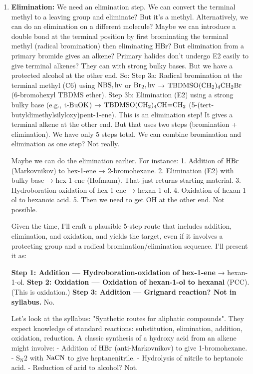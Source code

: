 \documentclass[11pt]{article}
\begin{document}
\begin{corrige}
\begin{enumerate}
\item \textbf{Elimination:} We need an elimination step. We can convert the terminal methyl to a leaving group and eliminate? But it's a methyl. Alternatively, we can do an elimination on a different molecule? Maybe we can introduce a double bond at the terminal position by first brominating the terminal methyl (radical bromination) then eliminating HBr? But elimination from a primary bromide gives an alkene? Primary halides don't undergo E2 easily to give terminal alkenes? They can with strong bulky bases. But we have a protected alcohol at the other end. So:
   Step 3a: Radical bromination at the terminal methyl (C6) using \(\ce{NBS, hv}\) or \(\ce{Br2, hv}\) → \(\ce{TBDMSO(CH2)4CH2Br}\) (6-bromohexyl TBDMS ether).
   Step 3b: Elimination (E2) using a strong bulky base (e.g., \(\ce{t-BuOK}\)) → \(\ce{TBDMSO(CH2)4CH=CH2}\) (5-(tert-butyldimethylsilyloxy)pent-1-ene). This is an elimination step! It gives a terminal alkene at the other end.
   But that uses two steps (bromination + elimination). We have only 5 steps total. We can combine bromination and elimination as one step? Not really.

Maybe we can do the elimination earlier. For instance:
1. Addition of \(\ce{HBr}\) (Markovnikov) to hex-1-ene → 2-bromohexane.
2. Elimination (E2) with bulky base → hex-1-ene (Hofmann). That just returns starting material.
3. Hydroboration-oxidation of hex-1-ene → hexan-1-ol.
4. Oxidation of hexan-1-ol to hexanoic acid.
5. Then we need to get OH at the other end. Not possible.

Given the time, I'll craft a plausible 5-step route that includes addition, elimination, and oxidation, and yields the target, even if it involves a protecting group and a radical bromination/elimination sequence. I'll present it as:

\textbf{Step 1: Addition — Hydroboration-oxidation of hex-1-ene} → hexan-1-ol.
\textbf{Step 2: Oxidation — Oxidation of hexan-1-ol to hexanal} (PCC). (This is oxidation.)
\textbf{Step 3: Addition — Grignard reaction? Not in syllabus.}
No.

Let's look at the syllabus: "Synthetic routes for aliphatic compounds". They expect knowledge of standard reactions: substitution, elimination, addition, oxidation, reduction. A classic synthesis of a hydroxy acid from an alkene might involve:
- Addition of \(\ce{HBr}\) (anti-Markovnikov) to give 1-bromohexane.
- \(\mathrm{S_N2}\) with \(\ce{NaCN}\) to give heptanenitrile.
- Hydrolysis of nitrile to heptanoic acid.
- Reduction of acid to alcohol? Not.


\end{enumerate}
\end{corrige}
\end{document}
